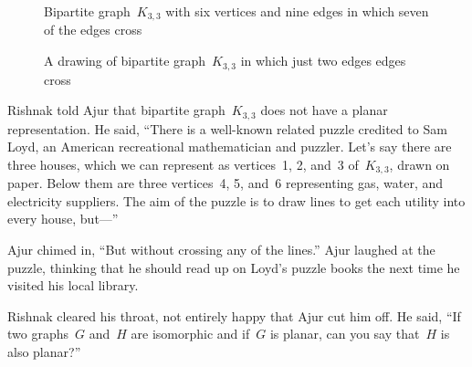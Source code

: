 \begin{figure}
\begin{center}
\caption{Bipartite graph~$K_{3,3}$ with six vertices and nine edges in which seven of the edges cross}\label{9g5}
\end{center}
\end{figure}

\begin{figure}
\begin{center}
\caption{A drawing of bipartite graph~$K_{3,3}$ in which just two edges edges cross}\label{9g6}
\end{center}
\end{figure}

Rishnak told Ajur that bipartite graph~$K_{3,3}$ does not have a planar representation. He said, ``There is a well-known related puzzle credited to Sam Loyd, an American recreational mathematician and puzzler. Let's say there are three houses, which we can represent as vertices~1, 2, and~3 of~$K_{3,3}$, drawn on paper. Below them are three vertices~4, 5, and~6 representing gas, water, and electricity suppliers. The aim of the puzzle is to draw lines to get each utility into every house, but---''

Ajur chimed in, ``But without crossing any of the lines.'' Ajur laughed at the puzzle, thinking that he should read up on Loyd's puzzle books the next time he visited his local library.

Rishnak cleared his throat, not entirely happy that Ajur cut him off. He said, ``If two graphs~$G$ and~$H$ are isomorphic and if~$G$ is planar, can you say that~$H$ is also planar?''

